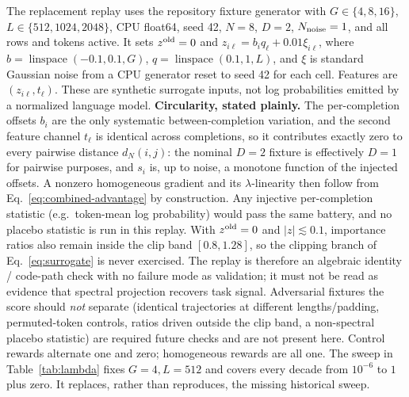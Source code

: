 \documentclass{article}
\begin{document}
The replacement replay uses the repository fixture generator with
$G\in\{4,8,16\}$, $L\in\{512,1024,2048\}$, CPU float64, seed 42,
$N=8$, $D=2$, $N_{\rm noise}=1$, and all rows and tokens active.
It sets $z^{\rm old}=0$ and $z_{i\ell}=b_iq_\ell+0.01\xi_{i\ell}$,
where $b=\operatorname{linspace}(-0.1,0.1,G)$,
$q=\operatorname{linspace}(0.1,1,L)$, and $\xi$ is standard Gaussian
noise from a CPU generator reset to seed 42 for each cell. Features are
$(z_{i\ell},t_\ell)$. These are synthetic surrogate inputs, not log
probabilities emitted by a normalized language model.
\textbf{Circularity, stated plainly.} The per-completion offsets $b_i$
are the only systematic between-completion variation, and the second
feature channel $t_\ell$ is identical across completions, so it
contributes exactly zero to every pairwise distance $d_N(i,j)$: the
nominal $D=2$ fixture is effectively $D=1$ for pairwise purposes, and
$s_i$ is, up to noise, a monotone function of the injected offsets. A
nonzero homogeneous gradient and its $\lambda$-linearity then follow
from Eq.~\eqref{eq:combined-advantage} by construction. Any injective
per-completion statistic (e.g.\ token-mean log probability) would pass
the same battery, and no placebo statistic is run in this replay. With
$z^{\rm old}=0$ and $|z|\lesssim0.1$, importance ratios also remain
inside the clip band $[0.8,1.28]$, so the clipping branch of
Eq.~\eqref{eq:surrogate} is never exercised. The replay is therefore an
algebraic identity / code-path check with no failure mode as validation;
it must not be read as evidence that spectral projection recovers task
signal. Adversarial fixtures the score should \emph{not} separate
(identical trajectories at different lengths/padding, permuted-token
controls, ratios driven outside the clip band, a non-spectral placebo
statistic) are required future checks and are not present here. Control rewards alternate
one and zero; homogeneous rewards are all one. The sweep in
Table~\ref{tab:lambda} fixes $G=4,L=512$ and covers every decade from
$10^{-6}$ to $1$ plus zero. It replaces, rather than reproduces, the missing
historical sweep.
\end{document}
